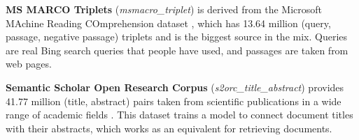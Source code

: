 \begin{table}[H]
  \centering
  \caption[Training dataset summary.]{Training dataset summary. Effective rows show the contribution of each dataset to the training mixture after weighted batch sampling. Total rows from all sources sum to 58.73M; effective rows sum to about 4.19M.}
  \label{tab:training_data}
\end{table}

\textbf{MS MARCO Triplets} (\textit{msmacro\_triplet}) is derived from the Microsoft MAchine Reading COmprehension dataset \cite{bajaj2016ms}, which has 13.64 million (query, passage, negative passage) triplets and is the biggest source in the mix. Queries are real Bing search queries that people have used, and passages are taken from web pages.

\textbf{Semantic Scholar Open Research Corpus} (\textit{s2orc\_title\_abstract}) provides 41.77 million (title, abstract) pairs taken from scientific publications in a wide range of academic fields \cite{lo2020s2orc}. This dataset trains a model to connect document titles with their abstracts, which works as an equivalent for retrieving documents.


